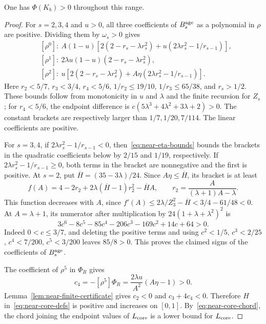 \begin{lemma}\label{lem:near-high-rho}
One has $\Phi(K_b)>0$ throughout this range.
\end{lemma}
\begin{proof}
For $s=2,3,4$ and $u>0$, all three coefficients of $B_s^{\rm age}$ as a polynomial in $\rho$ are positive. Dividing them by $\omega_s>0$ gives
\[
\begin{split}
 &[\rho^0]:\ A(1-u)[2(2-r_s-\lambda r_s^2)+u(2\lambda r_s^2-1/r_{s-1})],\\
 &[\rho^1]:\ 2\lambda u(1-u)(2-r_s-\lambda r_s^2),\\
 &[\rho^2]:\ u[2(2-r_s-\lambda r_s^2)+A\eta(2\lambda r_s^2-1/r_{s-1})].
\end{split}
\]
Here $r_2<5/7$, $r_3<3/4$, $r_4<5/6$, $1/r_2\le19/10$, $1/r_3\le65/38$, and $r_s>1/2$. These bounds follow from monotonicity in $u$ and $\lambda$ and the finite recursion for $Z_s$; for $r_4<5/6$, the endpoint difference is $c(5\lambda^3+4\lambda^2+3\lambda+2)>0$. The constant brackets are respectively larger than $1/7,1/20,7/114$. The linear coefficients are positive.

For $s=3,4$, if $2\lambda r_s^2-1/r_{s-1}<0$, then~\eqref{eq:near-eta-bounds} bounds the brackets in the quadratic coefficients below by $2/15$ and $1/19$, respectively. If $2\lambda r_s^2-1/r_{s-1}\ge0$, both terms in the bracket are nonnegative and the first is positive. At $s=2$, put $\overline H=(35-3\lambda)/24$. Since $A\eta\le\overline H$, its bracket is at least
\[
 f(A)=4-2r_2+2\lambda(\overline H-1)r_2^2-\overline H A,
 \qquad r_2=\frac A{(\lambda+1)A-\lambda}.
\]
This function decreases with $A$, since
$f'(A)\le2\lambda/Z_3^2-\overline H<3/4-61/48<0$.
At $A=\lambda+1$, its numerator after multiplication by $24(1+\lambda+\lambda^2)^2$ is
\[
 3c^6-8c^5-85c^4-206c^3-169c^2+14c+64>0.
\]
Indeed $0<c\le3/7$, and deleting the positive terms and using
$c^2<1/5$, $c^3<2/25$, $c^4<7/200$, $c^5<3/200$ leaves $85/8>0$. This proves the claimed signs of the coefficients of $B_s^{\rm age}$.

The coefficient of $\rho^5$ in $\Phi_R$ gives
\[
 c_4=-[\rho^5]\Phi_R=\frac{2\lambda u}{A^2}(A\eta-1)>0.
\]
Lemma~\ref{lem:near-finite-certificate} gives $c_2<0$ and $c_3+4c_4<0$. Therefore $H$ in~\eqref{eq:near-core-defs} is positive and increases on $[0,1]$. By~\eqref{eq:near-core-chord}, the chord joining the endpoint values of $L_{\rm core}$ is a lower bound for $L_{\rm core}$.


\end{proof}
